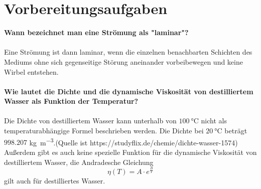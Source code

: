 \section{Vorbereitungsaufgaben}
\label{sec:Vorbereitungsaufgaben}
\textbf{Wann bezeichnet man eine Strömung als "laminar"?}\\
\\
Eine Strömung ist dann laminar, wenn die einzelnen benachbarten Schichten 
des Mediums ohne sich gegenseitige Störung aneinander vorbeibewegen und 
keine Wirbel entstehen. \\ 
\\
%
\textbf{Wie lautet die Dichte und die dynamische Viskosität von 
destilliertem Wasser als Funktion der Temperatur?}\\
\\
Die Dichte von destilliertem Wasser kann unterhalb von  
$\SI{100}{\celsius}$ nicht als temperaturabhängige Formel 
beschrieben werden.
Die Dichte bei $\SI{20}{\celsius}$ beträgt $998.207$ 
\unit[per-mode=fraction]{\kilo\gram\per\meter\tothe{3}}.(Quelle ist https://studyflix.de/chemie/dichte-wasser-1574)
Außerdem gibt es auch keine spezielle Funktion für die dynamische
Viskosität von destilliertem Wasser, die Andradesche Gleichung 
\begin{equation}
 \eta (T) = A \cdot e^{\frac{B}{T}}
 \label{equ:AndradescheGleichung}
\end{equation} 
gilt auch für destilliertes Wasser.
